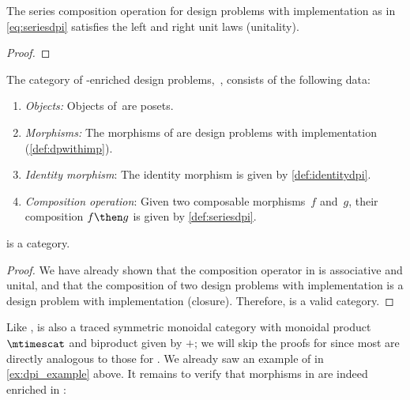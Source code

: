 {	\begin{lemma}
		The series composition operation for design problems with implementation as in \cref{eq:seriesdpi} satisfies the left and right unit laws (unitality).
	\end{lemma}

	\begin{proof}
	\end{proof}

	\begin{definition}
		The category of \Set-enriched design problems,~\DPI, consists of the following data:
		\begin{enumerate}
			\item \emph{Objects:}
			      Objects of~\DPI are posets.
			\item \emph{Morphisms:}
			      The morphisms of \DPI are design problems with implementation (\cref{def:dpwithimp}).
			\item \emph{Identity morphism}: The identity morphism is given by \cref{def:identitydpi}.
			\item \emph{Composition operation}: Given two composable morphisms~$f$ and~$g$, their composition $f\then g$ is given by \cref{def:seriesdpi}.
		\end{enumerate}
	\end{definition}

	\begin{lemma}
		\DPI is a category.
	\end{lemma}

	\begin{proof}
		We have already shown that the composition operator in \DPI is associative and unital, and that the composition of two design problems with implementation is a design problem with implementation (closure).
		Therefore, \DPI is a valid category.
	\end{proof}

	Like \DP, \DPI is also a traced symmetric monoidal category with monoidal product $\mtimescat$ and biproduct given by $+$;
	we will skip the proofs for \DPI since most are directly analogous to those for \DP.
	We already saw an example of \DPI in \cref{ex:dpi_example} above.
	It remains to verify that morphisms in \DPI are indeed enriched in \Set:

}
